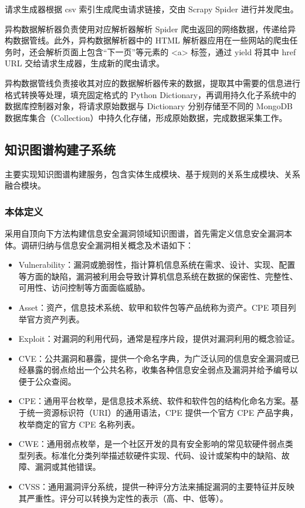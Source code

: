 \documentclass[a4paper,AutoFakeBold,oneside,12pt]{book}
\begin{document}
请求生成器根据 csv 索引生成爬虫请求链接，交由 Scrapy Spider 进行并发爬虫。

异构数据解析器负责使用对应解析器解析 Spider 爬虫返回的网络数据，传递给异构数据管线。此外，异构数据解析器中的 HTML 解析器应用在一些网站的爬虫任务时，还会解析页面上包含``下一页''等元素的 <a> 标签，通过 yield 将其中 href URL 交给请求生成器，生成新的爬虫请求。

异构数据管线负责接收其对应的数据解析器传来的数据，提取其中需要的信息进行格式转换等处理，填充固定格式的 Python Dictionary，再调用持久化子系统中的数据库控制器对象，将请求原始数据与 Dictionary 分别存储至不同的 MongoDB 数据库集合（Collection）中持久化存储，形成原始数据，完成数据采集工作。

\subsection{知识图谱构建子系统\label{知识图谱构建子系统}}

主要实现知识图谱构建服务，包含实体生成模块、基于规则的关系生成模块、关系融合模块。

\subsubsection{本体定义\label{本体定义}}

采用自顶向下方法构建信息安全漏洞领域知识图谱，首先需定义信息安全漏洞本体。调研归纳与信息安全漏洞相关概念及术语如下：
\begin{itemize}
	\item Vulnerability：漏洞或脆弱性，指计算机信息系统在需求、设计、实现、配置等方面的缺陷，漏洞被利用会导致计算机信息系统在数据的保密性、完整性、可用性、访问控制等方面面临威胁。\cite{cnnvd_vul_category}
	\item Asset：资产，信息技术系统、软甲和软件包等产品统称为资产。CPE 项目列举官方资产列表。
	\item Exploit：对漏洞的利用代码，通常是程序片段，提供对漏洞利用的概念验证。
	\item CVE：公共漏洞和暴露，提供一个命名字典，为广泛认同的信息安全漏洞或已经暴露的弱点给出一个公共名称，收集各种信息安全弱点及漏洞并给予编号以便于公众查阅。\cite{cve_intro}
	\item CPE：通用平台枚举，是信息技术系统、软件和软件包的结构化命名方案。基于统一资源标识符（URI）的通用语法，CPE 提供一个官方 CPE 产品字典，枚举商定的官方 CPE 名称列表。\cite{cpe_intro}
	\item CWE：通用弱点枚举，是一个社区开发的具有安全影响的常见软硬件弱点类型列表。标准化分类列举描述软硬件实现、代码、设计或架构中的缺陷、故障、漏洞或其他错误。\cite{cwe_intro}
	\item CVSS：通用漏洞评分系统，提供一种评分方法来捕捉漏洞的主要特征并反映其严重性。评分可以转换为定性的表示（高、中、低等）。\cite{cvss_intro}
\end{itemize}
\end{document}
